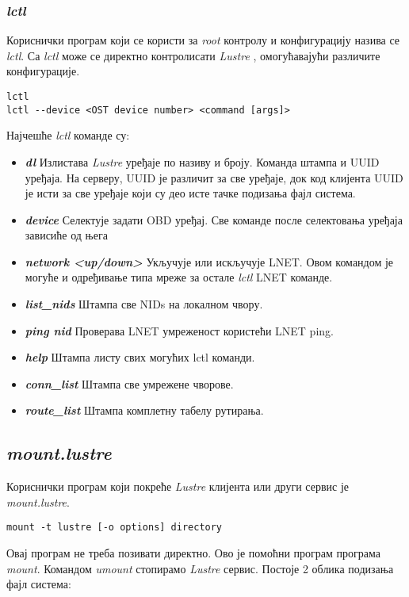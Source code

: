 \subsubsection{\textit{lctl}}
Кориснички програм који се користи за \textit{root} контролу и конфигурацију назива се \textit{lctl}. Са \textit{lctl} може се директно контролисати   \textit{Lustre} , омогућавајући различите конфигурације.
\begin{verbatim}
lctl
lctl --device <OST device number> <command [args]>
 \end{verbatim}
Најчешће \textit{lctl} команде су:
\begin{itemize}

\item \textbf{\textit{dl} }
Излистава   \textit{Lustre} уређаје по називу и броју. Команда штампа и UUID уређаја. На серверу, UUID је различит за све уређаје, док код клијента UUID је исти за све уређаје који су  део исте тачке подизања фајл система.
\item \textbf{\textit{device} }
Селектује задати OBD уређај. Све команде после селектовања уређаја зависиће од њега

\item \textbf{\textit{network <up/down>} }
Укључује или искључује LNET. Овом командом је могуће и одређивање типа мреже за остале \textit{lctl} LNET команде.
\item \textbf{\textit{list\_nids} }
Штампа све NIDs на локалном чвору. 
\item \textbf{\textit{ping {nid}} }
Проверава LNET умреженост користећи LNET ping.
\item \textbf{\textit{help} }
Штампа листу свих могућих  lctl команди. 
\item \textbf{\textit{conn\_list }}
Штампа све умрежене чворове.
 \item \textbf{\textit{route\_list }}
 Штампа комплетну табелу рутирања.
\end{itemize}

\subsection{\textit{mount.lustre}}

Кориснички програм који покреће   \textit{Lustre} клијента или други сервис је 
\textit{mount.lustre}.
\begin{verbatim}
mount -t lustre [-o options] directory
 \end{verbatim}

Овај програм не треба позивати директно. Ово је помоћни програм програма \textit{mount}. Командом \textit{umount} стопирамо   \textit{Lustre} сервис. Постоје 2 облика подизања фајл система:

